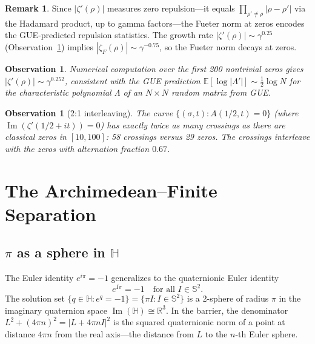 \documentclass[11pt,a4paper]{article}
\newtheorem{observation}[theorem]{Observation}
\theoremstyle{definition}
\newtheorem{remark}[theorem]{Remark}
\DeclareMathOperator{\im}{Im}
\begin{document}
\begin{remark}
Since $|\zeta'(\rho)|$ measures zero repulsion---it equals $\prod_{\rho' \ne \rho} |\rho - \rho'|$ via the Hadamard product, up to gamma factors---the Fueter norm at zeros encodes the GUE-predicted repulsion statistics. The growth rate $|\zeta'(\rho)| \sim \gamma^{0.25}$ (Observation~\ref{obs:growth}) implies $|\zeta_F(\rho)| \sim \gamma^{-0.75}$, so the Fueter norm decays at zeros.
\end{remark}

\begin{observation}\label{obs:growth}
Numerical computation over the first 200 nontrivial zeros gives $|\zeta'(\rho)| \sim \gamma^{0.252}$, consistent with the GUE prediction $\mathbb{E}[\log|\Lambda'|] \sim \frac{1}{2}\log N$ for the characteristic polynomial $\Lambda$ of an $N \times N$ random matrix from GUE.
\end{observation}

\begin{observation}[2:1 interleaving]
The curve $\{(\sigma, t) : A(1/2, t) = 0\}$ (where $\im(\zeta'(1/2+it)) = 0$) has exactly twice as many crossings as there are classical zeros in $[10, 100]$: 58 crossings versus 29 zeros. The crossings interleave with the zeros with alternation fraction $0.67$.
\end{observation}

\section{The Archimedean--Finite Separation}
\label{sec:separation}

\subsection{$\pi$ as a sphere in $\mathbb{H}$}

The Euler identity $e^{i\pi} = -1$ generalizes to the quaternionic Euler identity
\[
e^{I\pi} = -1 \quad \text{for all } I \in \mathbb{S}^2.
\]
The solution set $\{q \in \mathbb{H} : e^q = -1\} = \{\pi I : I \in \mathbb{S}^2\}$ is a 2-sphere of radius $\pi$ in the imaginary quaternion space $\im(\mathbb{H}) \cong \mathbb{R}^3$. In the barrier, the denominator $L^2 + (4\pi n)^2 = |L + 4\pi n I|^2$ is the squared quaternionic norm of a point at distance $4\pi n$ from the real axis---the distance from $L$ to the $n$-th Euler sphere.
\end{document}
